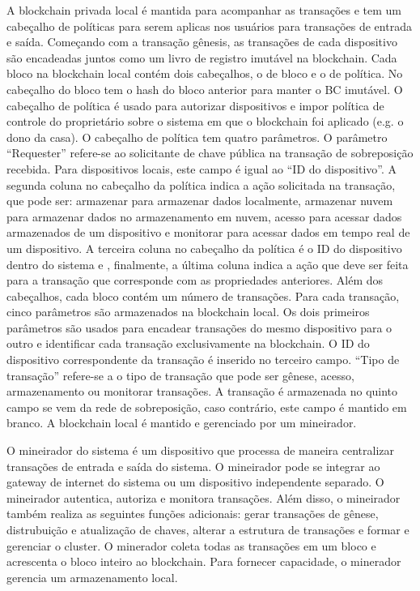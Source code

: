 A blockchain privada local é mantida para acompanhar as transações e tem um cabeçalho de políticas para serem aplicas nos usuários para transações de entrada e saída. Começando com a transação gênesis, as transações de cada dispositivo são encadeadas juntos como um livro de registro imutável na blockchain. Cada bloco na blockchain local contém dois cabeçalhos, o de bloco e o de política. No cabeçalho do bloco tem o hash do bloco anterior para manter o BC imutável. O cabeçalho de política é usado para autorizar dispositivos e impor política de controle do proprietário sobre o sistema em que o blockchain foi aplicado (e.g. o dono da casa). O cabeçalho de política tem quatro parâmetros. O parâmetro ``Requester'' refere-se ao solicitante de chave pública na transação de sobreposição recebida. Para dispositivos locais, este campo é igual ao ``ID do dispositivo''. A segunda coluna no cabeçalho da política indica a ação solicitada na transação, que pode ser: armazenar para armazenar dados localmente, armazenar nuvem para armazenar dados no armazenamento em nuvem, acesso para acessar dados armazenados de um dispositivo e monitorar para acessar dados em tempo real de um dispositivo. A terceira coluna no cabeçalho da política é o ID do dispositivo dentro do sistema e , finalmente, a última coluna indica a ação que deve ser feita para a transação que corresponde com as propriedades anteriores. Além dos cabeçalhos, cada bloco contém um número de transações. Para cada transação, cinco parâmetros são armazenados na blockchain local. Os dois primeiros parâmetros são usados para encadear transações do mesmo dispositivo para o outro e identificar cada transação exclusivamente na blockchain. O ID do dispositivo correspondente da transação é inserido no terceiro campo. ``Tipo de transação'' refere-se a o tipo de transação que pode ser gênese, acesso, armazenamento ou monitorar transações. A transação é armazenada no quinto campo se vem da rede de sobreposição, caso contrário, este campo é mantido em branco. A blockchain local é mantido e gerenciado por um mineirador.

O mineirador do sistema é um dispositivo que processa de maneira centralizar transações de entrada e saída do sistema. O mineirador pode se integrar ao gateway de internet do sistema ou um dispositivo independente separado. O mineirador autentica, autoriza e monitora transações. Além disso, o mineirador também realiza as seguintes funções adicionais: gerar transações de gênese, distrubuição e atualização de chaves, alterar a estrutura de transações e formar e gerenciar o cluster. O minerador coleta todas as transações em um bloco e acrescenta o bloco inteiro ao blockchain. Para fornecer capacidade, o minerador gerencia um armazenamento local.

